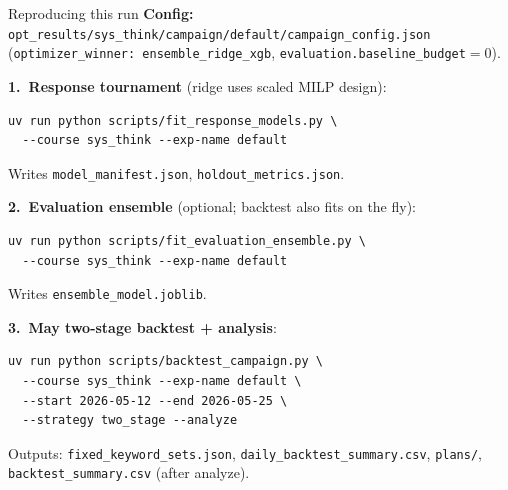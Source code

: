 \documentclass[11pt]{beamer}
\begin{document}
\begin{frame}[fragile]{Reproducing this run}
  \footnotesize
  \textbf{Config:} \texttt{opt\_results/sys\_think/campaign/default/campaign\_config.json}
  (\texttt{optimizer\_winner: ensemble\_ridge\_xgb}, \texttt{evaluation.baseline\_budget}${=}0$).

  \vspace{0.25em}
  \textbf{1.\ Response tournament} (ridge uses scaled MILP design):
  \begin{verbatim}
uv run python scripts/fit_response_models.py \
  --course sys_think --exp-name default
  \end{verbatim}
  Writes \texttt{model\_manifest.json}, \texttt{holdout\_metrics.json}.

  \vspace{0.15em}
  \textbf{2.\ Evaluation ensemble} (optional; backtest also fits on the fly):
  \begin{verbatim}
uv run python scripts/fit_evaluation_ensemble.py \
  --course sys_think --exp-name default
  \end{verbatim}
  Writes \texttt{ensemble\_model.joblib}.

  \vspace{0.15em}
  \textbf{3.\ May two-stage backtest + analysis}:
  \begin{verbatim}
uv run python scripts/backtest_campaign.py \
  --course sys_think --exp-name default \
  --start 2026-05-12 --end 2026-05-25 \
  --strategy two_stage --analyze
  \end{verbatim}
  Outputs: \texttt{fixed\_keyword\_sets.json}, \texttt{daily\_backtest\_summary.csv},
  \texttt{plans/}, \texttt{backtest\_summary.csv} (after analyze).
  \normalsize
\end{frame}
\end{document}
